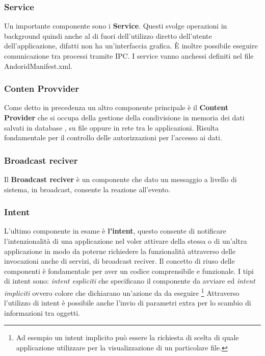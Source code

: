     \subsubsection{Service} Un importante componente sono i \textbf{Service}. Questi svolge operazioni in background quindi anche al di fuori dell'utilizzo diretto dell'utente dell'applicazione, difatti non ha un'interfaccia grafica. È inoltre possibile eseguire comunicazione tra processi tramite IPC. I service vanno anchessi definiti nel file AndoridManifest.xml.

    \subsubsection{Conten Provvider} Come detto in precedenza un altro componente principale è il \textbf{Content Provider} che si occupa della gestione della condivisione in memoria dei dati salvati in database , su file oppure in rete tra le applicazioni. Risulta fondamentale per il controllo delle autorizzazioni per l'accesso ai dati.
    
    \subsubsection{Broadcast reciver} Il \textbf{Broadcast reciver} è un componente che dato un messaggio a livello di sistema, in broadcast, consente la reazione all'evento. 
    
    \subsubsection{Intent} L'ultimo componente in esame è \textbf{l'intent}, questo consente di notificare l'intenzionalità di una applicazione nel voler attivare della stessa o di un'altra applicazione in modo da poterne richiedere la funzionalità attraverso delle invocazioni anche di servizi, di broadcast reciver. Il concetto di riuso delle componenti è fondamentale per aver un codice comprensibile e funzionale. I tipi di intent sono: \textit{intent espliciti} che specificano il componente da avviare ed \textit{intent impliciti} ovvero colore che dichiarano un'azione da da eseguire \footnote{Ad esempio un intent implicito può essere la richiesta di scelta di quale applicazione utilizzare per la visualizzazione di un particolare file.} Attraverso l'utilizzo di intent è possibile anche l'invio di parametri extra per lo scambio di informazioni tra oggetti. 


